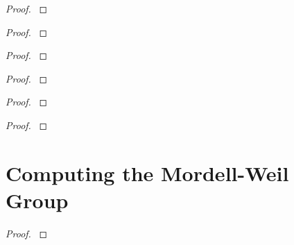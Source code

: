 \documentclass[12pt,reqno]{amsart}
\begin{document}
\begin{exe}\label{9.13}

\begin{proof}\label{s9.13}

\end{proof} 
\end{exe} 

\begin{exe}\label{9.14}

\begin{proof}\label{s9.14}

\end{proof} 
\end{exe} 

\begin{exe}\label{9.15}

\begin{proof}\label{s9.15}

\end{proof} 
\end{exe} 

\begin{exe}\label{9.16}

\begin{proof}\label{s9.16}

\end{proof} 
\end{exe} 

\begin{exe}\label{9.17}

\begin{proof}\label{s9.17}

\end{proof} 
\end{exe} 

\begin{exe}\label{9.18}

\begin{proof}\label{s9.18}

\end{proof} 
\end{exe} 


\newpage
\section{Computing the Mordell-Weil Group}\label{10}

\begin{exe}\label{10.1}

\begin{proof}\label{s10.1}

\end{proof} 
\end{exe} 
\end{document}
